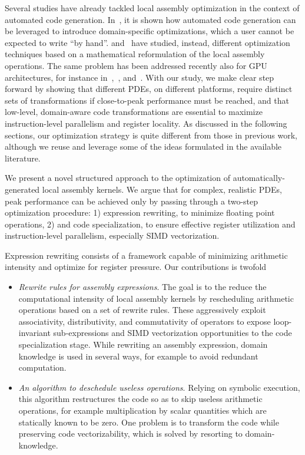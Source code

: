 Several studies have already tackled local assembly optimization in the context of automated code generation. In~\cite{quadrature1}, it is shown how automated code generation can be leveraged to introduce domain-specific optimizations, which a user cannot be expected to write ``by hand''. \cite{Kirby-FEM-opt} and~\cite{Francis} have studied, instead, different optimization techniques based on a mathematical reformulation of the local assembly operations. The same problem has been addressed recently also for GPU architectures, for instance in~\cite{petsc-integration-gpu},~\cite{Klockner}, and~\cite{Bana}. With our study, we make clear step forward by showing that different PDEs, on different platforms, require distinct sets of transformations if close-to-peak performance must be reached, and that low-level, domain-aware code transformations are essential to maximize instruction-level parallelism and register locality. As discussed in the following sections, our optimization strategy is quite different from those in previous work, although we reuse and leverage some of the ideas formulated in the available literature. 

We present a novel structured approach to the optimization of automatically-generated local assembly kernels. We argue that for complex, realistic PDEs, peak performance can be achieved only by passing through a two-step optimization procedure: 1) expression rewriting, to minimize floating point operations, 2) and code specialization, to ensure effective register utilization and instruction-level parallelism, especially SIMD vectorization. 

Expression rewriting consists of a framework capable of minimizing arithmetic intensity and optimize for register pressure. Our contributions is twofold
\begin{itemize}
\item \emph{Rewrite rules for assembly expressions}. The goal is to the reduce the computational intensity of local assembly kernels by rescheduling arithmetic operations based on a set of rewrite rules. These aggressively exploit associativity, distributivity, and commutativity of operators to expose loop-invariant sub-expressions and SIMD vectorization opportunities to the code specialization stage. While rewriting an assembly expression, domain knowledge is used in several ways, for example to avoid redundant computation.
\item \emph{An algorithm to deschedule useless operations}. Relying on symbolic execution, this algorithm restructures the code so as to skip useless arithmetic operations, for example multiplication by scalar quantities which are statically known to be zero. One problem is to transform the code while preserving code vectorizability, which is solved by resorting to domain-knowledge. 
\end{itemize}

